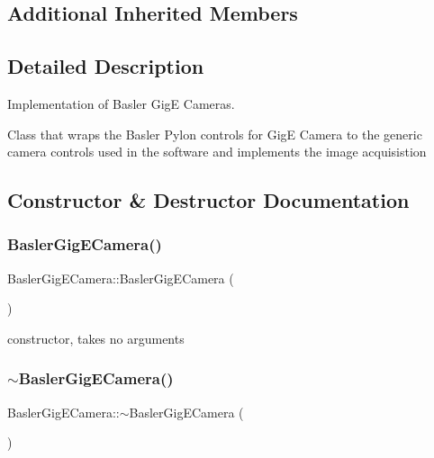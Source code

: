 \subsection*{Additional Inherited Members}


\subsection{Detailed Description}
Implementation of Basler GigE Cameras. 

Class that wraps the Basler Pylon controls for GigE Camera to the generic camera controls used in the software and implements the image acquisistion 

\subsection{Constructor \& Destructor Documentation}
\mbox{\label{class_basler_gig_e_camera_a4e73954bf129084f8ad3aae41eb07ed5}} 
\subsubsection{\texorpdfstring{Basler\+Gig\+E\+Camera()}{BaslerGigECamera()}}
{\footnotesize\ttfamily Basler\+Gig\+E\+Camera\+::\+Basler\+Gig\+E\+Camera (\begin{DoxyParamCaption}{ }\end{DoxyParamCaption})}

constructor, takes no arguments \mbox{\label{class_basler_gig_e_camera_a0dbeed22c6adda8a9a9e7172a1a3f7ea}} 
\subsubsection{\texorpdfstring{$\sim$\+Basler\+Gig\+E\+Camera()}{~BaslerGigECamera()}}
{\footnotesize\ttfamily Basler\+Gig\+E\+Camera\+::$\sim$\+Basler\+Gig\+E\+Camera (\begin{DoxyParamCaption}{ }\end{DoxyParamCaption})}

